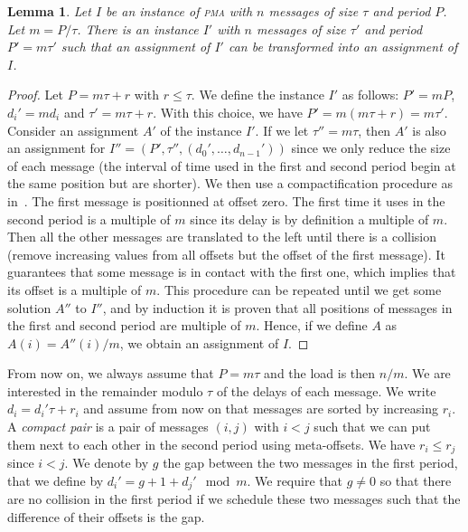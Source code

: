 \documentclass[10pt, conference, letterpaper]{IEEEtran}
\newtheorem{lemma}[theorem]{Lemma}
\newcommand\pma{\textsc{pma}\xspace}
\begin{document}
\begin{lemma}
Let $I$ be an instance of \pma with $n$ messages of size $\tau$ and period $P$.
Let $m = P / \tau$. There is an instance $I'$ with $n$ messages of size $\tau'$ and period $P'= m\tau'$ such that an assignment of $I'$ can be transformed into an assignment of $I$.
\end{lemma}
\begin{proof}
Let $P = m \tau + r$ with $r \leq \tau$. We define the instance $I'$ as follows: $P' = mP$, $d_{i}' = m d_i$ and $\tau' = m \tau + r$. With this choice, we have $P' = m(m \tau + r) = m \tau'$.
Consider an assignment $A'$ of the instance $I'$.
If we let $\tau'' = m\tau$, then $A'$ is also an assignment for $I'' = (P',\tau'',(d_{0}',\dots,d_{n-1}'))$ since we only reduce the size of each message (the interval of time used in the first and second period begin at the same position but are shorter).
We then use a compactification procedure as in~\cite{barth2018deterministic}. The first message is positionned at offset zero. The first time it uses in the second period is a multiple of $m$ since its delay is by definition a multiple of $m$. Then all the other messages are translated to the left until there is a collision (remove increasing values from all offsets but the offset of the first message). It guarantees that some message is in contact with the first one,  which implies that its offset is a multiple of $m$. This procedure can be repeated until we get some solution $A''$ to $I''$, and by induction it is proven that all positions of messages in the first and second period are multiple of $m$. Hence, if we define $A$ as $A(i) = A''(i)/m$, we obtain an assignment of $I$.
\end{proof}

From now on, we always assume that $P = m\tau$ and the load is then $n/m$.
We are interested in the remainder modulo $\tau$ of the delays of each message.
We write $d_i = d_{i}'\tau + r_i$ and assume from now on that messages are sorted by increasing $r_i$.
A \emph{compact pair} is a pair of messages $(i,j)$ with $i < j$ such that we can put them
next to each other in the second period using meta-offsets.
We have $r_i \leq r_j$ since $i < j$. We denote by $g$ the gap between the two messages in the first period, that we define by $d_{i}' = g + 1 + d_{j}' \mod m$. We require that $g \neq 0$ so that there are no collision in the first period if we schedule these two messages such that the difference of their offsets is the gap. 
\end{document}
